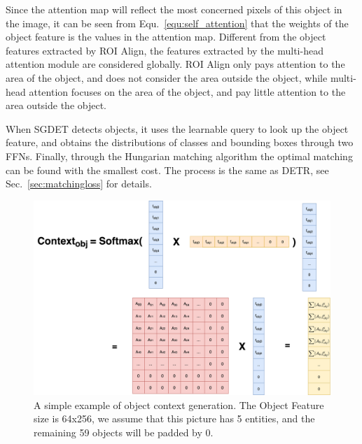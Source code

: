 Since the attention map will reflect the most concerned pixels of this object in the image, it can be seen from Equ.~\ref{equ:self_attention} that the weights of the object feature is the values in the attention map. Different from the object features extracted by ROI Align, the features extracted by the multi-head attention module are considered globally. ROI Align only pays attention to the area of the object, and does not consider the area outside the object, while multi-head attention focuses on the area of the object, and pay little attention to the area outside the object.

When SGDET detects objects, it uses  the learnable query to look up the object feature, and obtains the distributions of classes and bounding boxes through two FFNs. Finally, through the Hungarian matching algorithm the optimal matching can be found with the smallest cost. The process is the same as DETR, see Sec.~\ref{sec:matchingloss} for details.
%
%


\begin{figure}[h]
	\centering
	\includegraphics[width=1\linewidth]{figures/obj_context}
	\caption[A simple example of the  Object Context generation.]{A simple example of object context generation. The Object Feature size is 64x256, we assume that this picture has 5 entities, and the remaining 59 objects will be padded by 0.}
	\label{fig:objcontext}
\end{figure}

